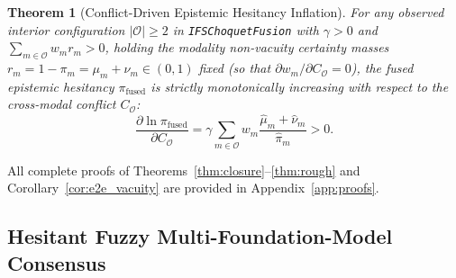 \documentclass[10pt,twocolumn]{article}
\newtheorem{theorem}{Theorem}
\begin{document}
\begin{theorem}[Conflict-Driven Epistemic Hesitancy Inflation]
\label{thm:conflict}
For any observed interior configuration $|\mathcal{O}| \ge 2$ in \texttt{IFSChoquetFusion} with
$\gamma > 0$ and $\sum_{m\in\mathcal{O}} w_m r_m > 0$, holding the modality non-vacuity
certainty masses $r_m = 1 - \pi_m = \mu_m + \nu_m \in (0, 1)$ fixed (so that $\partial w_m /
\partial C_{\mathcal{O}} = 0$), the fused epistemic hesitancy $\pi_{\text{fused}}$ is strictly
monotonically increasing with respect to the cross-modal conflict $C_{\mathcal{O}}$:
\begin{equation}
\frac{\partial \ln \pi_{\text{fused}}}{\partial C_{\mathcal{O}}} = \gamma \sum_{m \in
\mathcal{O}} w_m \frac{\hat{\mu}_m + \hat{\nu}_m}{\hat{\pi}_m} > 0.
\end{equation}
\end{theorem}

All complete proofs of Theorems~\ref{thm:closure}--\ref{thm:rough} and
Corollary~\ref{cor:e2e_vacuity} are provided in Appendix~\ref{app:proofs}.

\subsection{Hesitant Fuzzy Multi-Foundation-Model Consensus}
\end{document}
